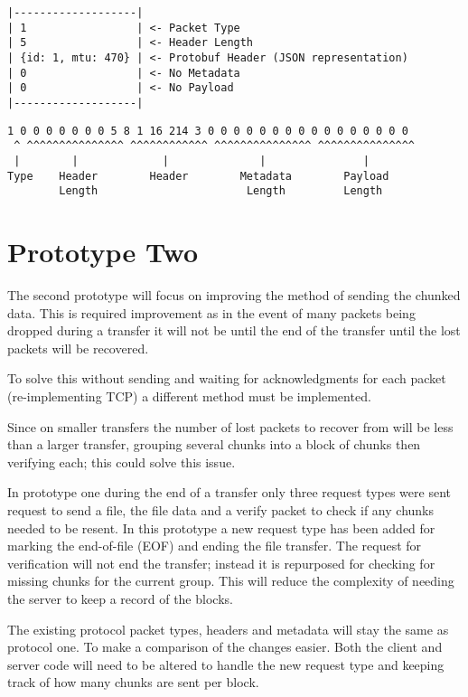 \begin{lstlisting}[float,caption={Prototype One Example Packet Structure},label=p1d-example-structure]
|-------------------|
| 1                 | <- Packet Type
| 5                 | <- Header Length
| {id: 1, mtu: 470} | <- Protobuf Header (JSON representation)
| 0                 | <- No Metadata
| 0                 | <- No Payload
|-------------------|
\end{lstlisting}

\begin{lstlisting}[float,caption={Prototype One Example Packet Binary},label=p1d-example-binary]
 1 0 0 0 0 0 0 0 5 8 1 16 214 3 0 0 0 0 0 0 0 0 0 0 0 0 0 0 0 0
 ^ ^^^^^^^^^^^^^^^ ^^^^^^^^^^^^ ^^^^^^^^^^^^^^^ ^^^^^^^^^^^^^^^
 |        |             |              |               |
Type    Header        Header        Metadata        Payload
        Length                       Length         Length
\end{lstlisting}

\FloatBarrier


\section{Prototype Two}
The second prototype will focus on improving the method of sending the chunked data. This is required improvement as in the event of many packets being dropped during a transfer it will not be until the end of the transfer until the lost packets will be recovered.

To solve this without sending and waiting for acknowledgments for each packet (re-implementing TCP) a different method must be implemented.

Since on smaller transfers the number of lost packets to recover from will be less than a larger transfer, grouping several chunks into a block of chunks then verifying each; this could solve this issue.

In prototype one during the end of a transfer only three request types were sent request to send a file, the file data and a verify packet to check if any chunks needed to be resent. In this prototype a new request type has been added for marking the end-of-file (EOF) and ending the file transfer. The request for verification will not end the transfer; instead it is repurposed for checking for missing chunks for the current group. This will reduce the complexity of needing the server to keep a record of the blocks.

The existing protocol packet types, headers and metadata will stay the same as protocol one. To make a comparison of the changes easier. Both the client and server code will need to be altered to handle the new request type and keeping track of how many chunks are sent per block.


